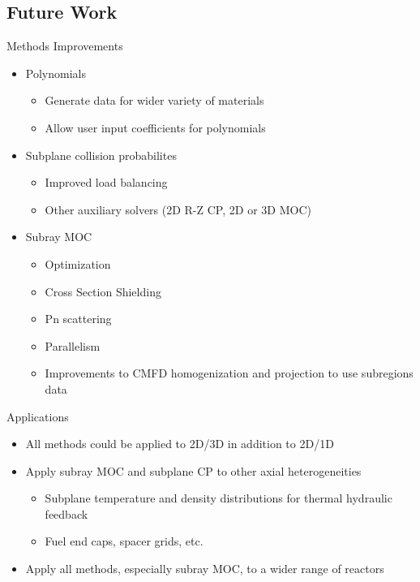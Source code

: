 
\subsection{Future Work}
\begin{frame}[t]{Methods Improvements}
    
    \begin{itemize}
        \item Polynomials
        \begin{itemize}
            \item Generate data for wider variety of materials
            \item Allow user input coefficients for polynomials
        \end{itemize}
        \item Subplane collision probabilites
        \begin{itemize}
            \item Improved load balancing
            \item Other auxiliary solvers (2D R-Z CP, 2D or 3D MOC)
        \end{itemize}
        \item Subray MOC
        \begin{itemize}
            \item Optimization
            \item Cross Section Shielding
            \item Pn scattering
            \item Parallelism
            \item Improvements to CMFD homogenization and projection to use subregions data
        \end{itemize}
    \end{itemize}
    
\end{frame}


\begin{frame}[t]{Applications}
    
    \begin{itemize}
        \item All methods could be applied to 2D/3D in addition to 2D/1D
        \item Apply subray MOC and subplane CP to other axial heterogeneities
        \begin{itemize}
            \item Subplane temperature and density distributions for thermal hydraulic feedback
            \item Fuel end caps, spacer grids, etc.
        \end{itemize}
        \item Apply all methods, especially subray MOC, to a wider range of reactors
    \end{itemize}

\end{frame}

